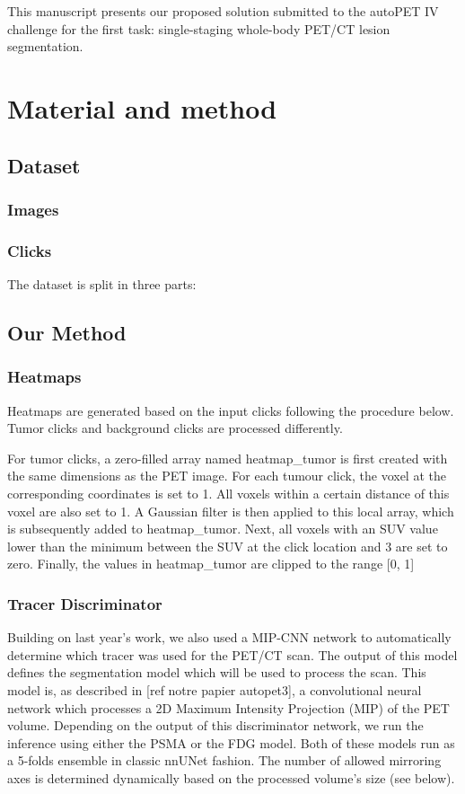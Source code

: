 \documentclass[runningheads]{llncs}
\begin{document}
This manuscript presents our proposed solution submitted to the autoPET IV challenge for the first task: single-staging whole-body PET/CT lesion segmentation.


\section{Material and method}
\subsection{Dataset}
\subsubsection{Images}
\subsubsection{Clicks}
The dataset is split in three parts:

\subsection{Our Method}
\subsubsection{Heatmaps}
Heatmaps are generated based on the input clicks following the procedure below.
Tumor clicks and background clicks are processed differently.

For tumor clicks, a zero-filled array named heatmap_tumor is first created with the same dimensions as the PET image. For each tumour click, the voxel at the corresponding coordinates is set to 1.
All voxels within a certain distance of this voxel are also set to 1. A Gaussian filter is then applied to this local array, which is subsequently added to heatmap_tumor.
Next, all voxels with an SUV value lower than the minimum between the SUV at the click location and 3 are set to zero.
Finally, the values in heatmap_tumor are clipped to the range [0, 1]
\subsubsection{Tracer Discriminator}
Building on last year’s work, we also used a MIP-CNN network to automatically determine which tracer was used for the PET/CT scan.
The output of this model defines the segmentation model which will be used to process the scan.
This model is, as described in [ref notre papier autopet3], a convolutional neural network which processes a 2D Maximum Intensity Projection (MIP) of the PET volume.
Depending on the output of this discriminator network, we run the inference using either the PSMA or the FDG model.
Both of these models run as a 5-folds ensemble in classic nnUNet fashion. The number of allowed mirroring axes is determined dynamically based on the processed volume’s size (see below).
\end{document}
